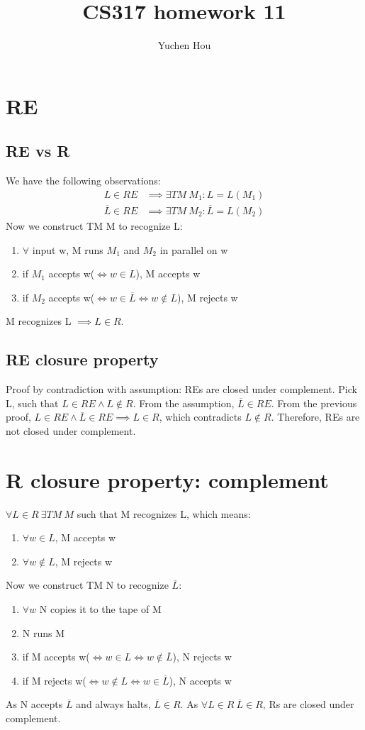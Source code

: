 \documentclass{article}
\begin{document}
\lstset{language=Java}
\title{CS317 homework 11}
\author{Yuchen Hou}
\maketitle

\section{RE}
\subsection{RE vs R}
We have the following observations:
\begin{align*}
L \in RE &\implies \exists TM \ M_1 : L = L(M_1) \\
\overline{L} \in RE &\implies \exists TM \ M_2 : \overline{L} = L(M_2)
\end{align*}
Now we construct TM M to recognize L:
\begin{enumerate}
  \item $\forall$ input w, M runs $M_1$ and $M_2$ in parallel on w
  \item if $M_1 $ accepts w($\iff w \in L$), M accepts w
  \item if $M_2$ accepts w($\iff w \in \overline{L} \iff w \notin L $), M
  rejects w
\end{enumerate}
M recognizes L $\implies L \in R$.
\subsection{RE closure property}
Proof by contradiction with assumption: REs are closed under complement. Pick
L, such that $L \in RE \land L\notin R$. From the assumption, $\overline{L} \in
RE$. From the previous proof, $L \in RE \land \overline{L} \in RE \implies L
\in R$, which contradicts $L\notin R$. Therefore, REs are not closed under
complement.

\section{R closure property: complement}
$\forall L \in R \ \exists TM \ M$ such that M recognizes L, which means:
\begin{enumerate}
  \item $\forall w \in L$, M accepts w
  \item $\forall w \notin L$, M rejects w
\end{enumerate}
Now we construct TM N to recognize $\overline{L}$:
\begin{enumerate}
  \item $\forall w$ N copies it to the tape of M
  \item N runs M
  \item if M accepts w($\iff w \in L \iff w \notin \overline{L}$), N rejects w
  \item if M rejects w($\iff w \notin L \iff w \in \overline{L}$), N accepts w
\end{enumerate}
As N accepts $\overline{L}$ and always halts, $\overline{L} \in R$. As $\forall
L \in R \ \overline{L} \in R$, Rs are closed under complement.
\end{document}
